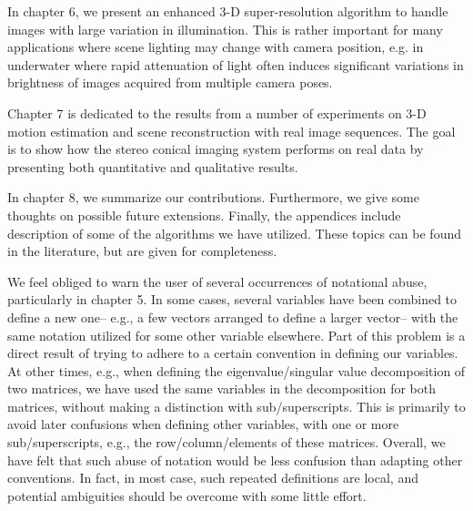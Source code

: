 In chapter 6, we present an enhanced 3-D super-resolution algorithm to handle images with large
variation in illumination. This is rather important for many applications where scene lighting may
change with camera position, e.g. in underwater where rapid attenuation of light often induces
significant variations in brightness of images acquired from multiple camera poses.

Chapter 7 is dedicated to the results from a number of experiments on 3-D motion estimation and
scene reconstruction with real image sequences. The goal is to show how the stereo conical imaging
system performs on real data by presenting both quantitative and qualitative results.


In chapter 8, we summarize our contributions. Furthermore, we give some thoughts on possible future
extensions.  Finally, the appendices include description of some of the algorithms we have
utilized. These topics can be found in the literature, but are given for completeness.

We feel obliged to warn the user of several occurrences of notational abuse, particularly in
chapter 5. In some cases, several variables have been combined to define a new one-- e.g., a few
vectors arranged to define a larger vector-- with the same notation utilized for some other
variable elsewhere. Part of this problem is a direct result of trying to adhere to a certain
convention in defining our variables. At other times, e.g., when defining the eigenvalue/singular
value decomposition of two matrices, we have used the same variables in the decomposition for both
matrices, without making a distinction with sub/superscripts. This is primarily to avoid later
confusions when defining other variables, with one or more sub/superscripts, e.g., the
row/column/elements of these matrices. Overall, we have felt that such abuse of notation would be
less confusion than adapting other conventions. In fact, in most case, such repeated definitions
are local, and potential ambiguities should be overcome with some little effort.
